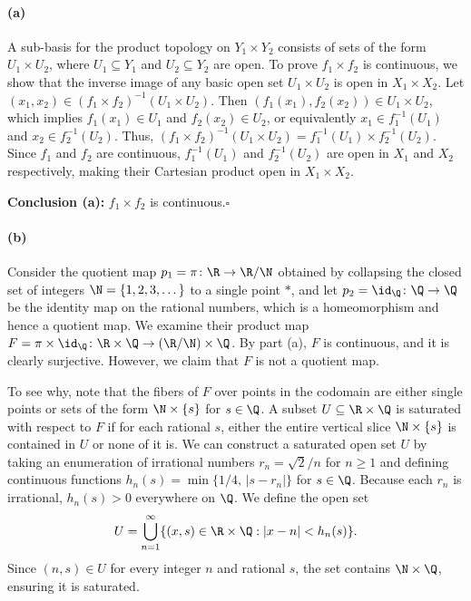 
\paragraph{(a)}
A sub-basis for the product topology on $Y_1\times Y_2$ consists of sets of the form
$U_1\times U_2$, where $U_1\subseteq Y_1$ and $U_2\subseteq Y_2$ are open. To prove
$f_1\times f_2$ is continuous, we show that the inverse image of any basic open set
$U_1\times U_2$ is open in $X_1\times X_2$. Let
$(x_1,x_2)\in(f_1\times f_2)^{-1}(U_1\times U_2)$. Then
$(f_1(x_1),f_2(x_2))\in U_1\times U_2$, which implies $f_1(x_1)\in U_1$ and $f_2(x_2)\in U_2$,
or equivalently $x_1\in f_1^{-1}(U_1)$ and $x_2\in f_2^{-1}(U_2)$. Thus,
$(f_1\times f_2)^{-1}(U_1\times U_2)=f_1^{-1}(U_1)\times f_2^{-1}(U_2)$. Since $f_1$ and $f_2$
are continuous, $f_1^{-1}(U_1)$ and $f_2^{-1}(U_2)$ are open in $X_1$ and $X_2$ respectively,
making their Cartesian product open in $X_1\times X_2$.

\textbf{Conclusion (a):} $f_1\times f_2$ is continuous.\hfill$\square$

\paragraph{(b)}
Consider the quotient map $p_1=\pi\colon\R\to\R/\N$ obtained by collapsing the closed set of
integers $\N=\{1,2,3,\dots\}$ to a single point $*$, and let $p_2=\id_\Q\colon\Q\to\Q$ be the
identity map on the rational numbers, which is a homeomorphism and hence a quotient map. We
examine their product map $F=\pi\times\id_\Q\colon\R\times\Q\to(\R/\N)\times\Q$. By part (a),
$F$ is continuous, and it is clearly surjective. However, we claim that $F$ is not a quotient
map.

To see why, note that the fibers of $F$ over points in the codomain are either single points or
sets of the form $\N\times\{s\}$ for $s\in\Q$. A subset $U\subseteq\R\times\Q$ is saturated with
respect to $F$ if for each rational $s$, either the entire vertical slice $\N\times\{s\}$ is
contained in $U$ or none of it is. We can construct a saturated open set $U$ by taking an
enumeration of irrational numbers $r_n=\sqrt2/n$ for $n\ge1$ and defining continuous functions
$h_n(s)=\min\{1/4,\,|s-r_n|\}$ for $s\in\Q$. Because each $r_n$ is irrational, $h_n(s)>0$
everywhere on $\Q$. We define the open set
\[ U=\bigcup_{n=1}^\infty\{(x,s)\in\R\times\Q : |x-n|<h_n(s)\}. \]
Since $(n,s)\in U$ for every integer $n$ and rational $s$, the set contains $\N\times\Q$,
ensuring it is saturated.

